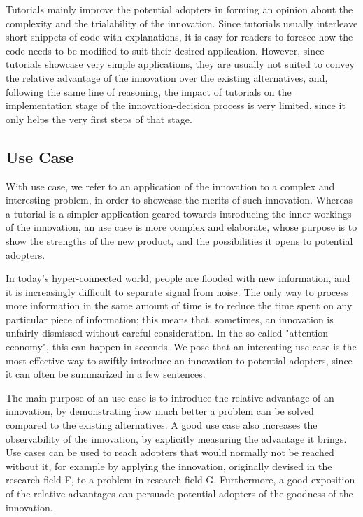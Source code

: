 \documentclass[12pt]{article}
\begin{document}
Tutorials mainly improve the potential adopters in forming an opinion about the complexity and the trialability of the innovation. Since tutorials usually interleave short snippets of code with explanations, it is easy for readers to foresee how the code needs to be modified to suit their desired application. However, since tutorials showcase very simple applications, they are usually not suited to convey the relative advantage of the innovation over the existing alternatives, and, following the same line of reasoning, the impact of tutorials on the implementation stage of the innovation-decision process is very limited, since it only helps the very first steps of that stage.

\subsection{Use Case}
\label{sec:org74c2127}
With use case, we refer to an application of the innovation to a complex and interesting problem, in order to showcase the merits of such innovation. Whereas a tutorial is a simpler application geared towards introducing the  inner workings of the innovation, an use case is more complex and elaborate, whose purpose is to show the strengths of the new product, and the possibilities it opens to potential adopters.

In today's hyper-connected world, people are flooded with new information, and it is increasingly difficult to separate signal from noise. The only way to process more information in the same amount of time is to reduce the time spent on any particular piece of information; this means that, sometimes, an innovation is unfairly dismissed without careful consideration. In the so-called "attention economy", this can happen in seconds. We pose that an interesting use case is the most effective way to swiftly introduce an innovation to potential adopters, since it can often be summarized in a few sentences.

The main purpose of an use case is to introduce the relative advantage of an innovation, by demonstrating how much better a problem can be solved compared to the existing alternatives. A good use case also increases the observability of the innovation, by explicitly measuring the advantage it brings. Use cases can be used to reach adopters that would normally not be reached without it, for example by applying the innovation, originally devised in the research field F, to a problem in research field G. Furthermore, a good exposition of the relative advantages can persuade potential adopters of the goodness of the innovation.
\end{document}
